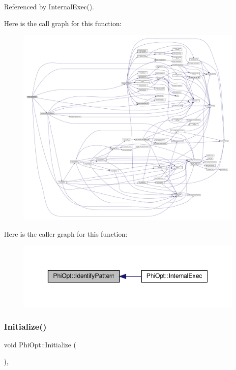 Referenced by Internal\+Exec().

Here is the call graph for this function\+:
\nopagebreak
\begin{figure}[H]
\begin{center}
\leavevmode
\includegraphics[width=350pt]{dc/ddf/classPhiOpt_a152f18a024bdfc6164aed9ad0cafe910_cgraph}
\end{center}
\end{figure}
Here is the caller graph for this function\+:
\nopagebreak
\begin{figure}[H]
\begin{center}
\leavevmode
\includegraphics[width=339pt]{dc/ddf/classPhiOpt_a152f18a024bdfc6164aed9ad0cafe910_icgraph}
\end{center}
\end{figure}
\mbox{\label{classPhiOpt_a1b620dd1d02ad1accbfe986e02add067}} 
\subsubsection{\texorpdfstring{Initialize()}{Initialize()}}
{\footnotesize\ttfamily void Phi\+Opt\+::\+Initialize (\begin{DoxyParamCaption}{ }\end{DoxyParamCaption})\hspace{0.3cm}{\ttfamily [override]}, {\ttfamily [virtual]}}



